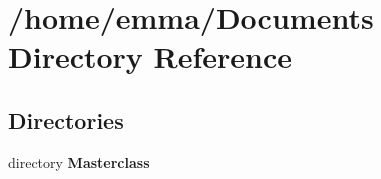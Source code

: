 \section{/home/emma/\+Documents Directory Reference}
\label{dir_f396504afdc959660871b003fa10164d}
\subsection*{Directories}
\begin{DoxyCompactItemize}
\item 
directory \textbf{ Masterclass}
\end{DoxyCompactItemize}
